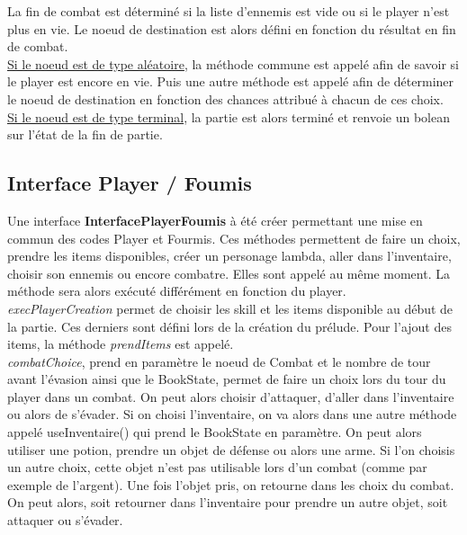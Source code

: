 		La fin de combat est déterminé si la liste d'ennemis est vide ou si le player n'est plus en vie. Le noeud de destination est alors défini en fonction du résultat en fin de combat.\\


		\underline{Si le noeud est de type aléatoire}, la méthode commune est appelé afin de savoir si le player est encore en vie. Puis une autre méthode est appelé afin de déterminer le noeud de destination en fonction des chances attribué à chacun de ces choix.\\

		\underline{Si le noeud est de type terminal}, la partie est alors terminé et renvoie un bolean sur l'état de la fin de partie.\\

	\subsection{Interface Player / Foumis}
		Une interface \textbf{InterfacePlayerFoumis} à été créer permettant une mise en commun des codes Player et Fourmis. Ces méthodes permettent de faire un choix, prendre les items disponibles, créer un personage lambda, aller dans l'inventaire, choisir son ennemis ou encore combatre. Elles sont appelé au même moment. La méthode sera alors exécuté différément en fonction du player.\\

		\textit{execPlayerCreation} permet de choisir les skill et les items disponible au début de la partie. Ces derniers sont défini lors de la création du prélude. Pour l'ajout des items, la méthode \textit{prendItems} est appelé.\\

		\textit{combatChoice}, prend en paramètre le noeud de Combat et le nombre de tour avant l'évasion ainsi que le BookState, permet de faire un choix lors du tour du player dans un combat. On peut alors choisir d'attaquer, d'aller dans l'inventaire ou alors de s'évader. Si on choisi l'inventaire, on va alors dans une autre méthode appelé useInventaire() qui prend le BookState en paramètre. On peut alors utiliser une potion, prendre un objet de défense ou alors une arme. Si l'on choisis un autre choix, cette objet n'est pas utilisable lors d'un combat (comme par exemple de l'argent). Une fois l'objet pris, on retourne dans les choix du combat. On peut alors, soit retourner dans l'inventaire pour prendre un autre objet, soit attaquer ou s'évader.\\

